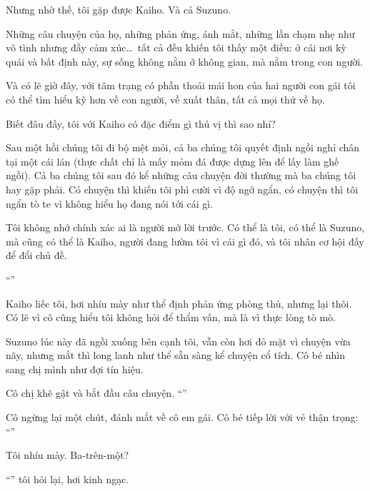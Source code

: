 \documentclass[../main.tex]{subfiles}
\begin{document}
Nhưng nhờ thế, tôi gặp được Kaiho. Và cả Suzuno.

Những câu chuyện của họ, những phản ứng, ánh mắt, những lần chạm nhẹ như vô tình nhưng đầy cảm xúc\dots\ tất cả đều khiến tôi thấy một điều: ở cái nơi kỳ quái và bất định này, sự sống không nằm ở không gian, mà nằm trong con người.

Và có lẽ giờ đây, với tâm trạng có phần thoải mái hon của hai người con gái tôi có thể tìm hiểu kỹ hơn về con người, về xuất thân, tất cả mọi thứ về họ.

Biết đâu đấy, tôi với Kaiho có đặc điểm gì thú vị thì sao nhỉ?

\ct

Sau một hồi chúng tôi đi bộ mệt mỏi, cả ba chúng tôi quyết định ngồi nghỉ chân tại một cái lán (thực chất chỉ là mấy mỏm đá được dựng lên để lấy làm ghế ngồi). Cả ba chúng tôi sau đó kể những câu chuyện đời thường mà ba chúng tôi hay gặp phải. Có chuyện thì khiến tôi phì cười vì độ ngớ ngẩn, có chuyện thì tôi ngẩn tò te vì không hiểu họ đang nói tới cái gì.

Tôi không nhớ chính xác ai là người mở lời trước. Có thể là tôi, có thể là Suzuno, mà cũng có thể là Kaiho, người đang lườm tôi vì cái gì đó, và tôi nhân cơ hội đấy để đổi chủ đề.

``''

Kaiho liếc tôi, hơi nhíu mày như thể định phản ứng phòng thủ, nhưng lại thôi. Có lẽ vì cô cũng hiểu tôi không hỏi để thẩm vấn, mà là vì thực lòng tò mò.

Suzuno lúc này đã ngồi xuống bên cạnh tôi, vẫn còn hơi đỏ mặt vì chuyện vừa nãy, nhưng mắt thì long lanh như thể sẵn sàng kể chuyện cổ tích. Cô bé nhìn sang chị mình như đợi tín hiệu.

Cô chị khẽ gật và bắt đầu câu chuyện. ``''

Cô ngừng lại một chút, đánh mắt về cô em gái. Cô bé tiếp lời với vẻ thận trọng: ``''

Tôi nhíu mày. Ba-trên-một?

``'' tôi hỏi lại, hơi kinh ngạc.
\end{document}
